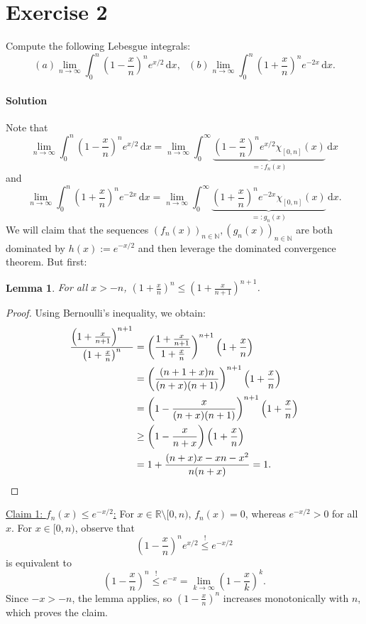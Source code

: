 \documentclass[10pt]{article}\usepackage[]{graphicx}\usepackage[]{color}
\newtheorem*{lemma}{Lemma}
\newcommand{\N}{\mathbb{N}}
\newcommand{\R}{\mathbb{R}}
\newcommand{\df}{\,\textrm{d}}
\begin{document}
\section*{Exercise 2}
Compute the following Lebesgue integrals:
\[
  (a) \lim_{n \to \infty} \int_0^n \left(1 - \frac{x}{n}\right)^n e^{x/2} \df x,~~~
  (b) \lim_{n \to \infty} \int_0^n \left(1 + \frac{x}{n}\right)^n e^{-2x} \df x.
\]

\paragraph{Solution}
Note that 
\[
 \lim_{n \to \infty} \int_0^n \left(1 - \frac{x}{n}\right)^n e^{x/2} \df x = \lim_{n \to \infty} \int_0^{\infty} \underbrace{\left(1 - \frac{x}{n}\right)^n e^{x/2} \chi_{[0, n]}(x)}_{=: f_n(x)} \df x
\]
and
\[
 \lim_{n \to \infty} \int_0^n \left(1 + \frac{x}{n}\right)^n e^{-2x} \df x = \lim_{n \to \infty} \int_0^{\infty} \underbrace{\left(1 + \frac{x}{n}\right)^n e^{-2x} \chi_{[0, n]}(x)}_{=: g_n(x)} \df x.
\]
We will claim that the sequences $(f_n(x))_{n \in \N}, (g_n(x))_{n \in \N}$
are both dominated by $h(x) := e^{-x/2}$ and then leverage the dominated convergence theorem.
But first:

\begin{lemma}
For all $x > - n$, $\left(1 + \frac{x}{n}\right)^n \leq \left(1 + \frac{x}{n+1}\right)^{n+1}$.
\end{lemma}
\begin{proof} Using Bernoulli's inequality, we obtain:
\begin{align*}
  \frac{\left(1 + \frac{x}{n+1}\right)^{n+1}}{\left(1 + \frac{x}{n}\right)^n}
  &= \left(\frac{1 + \frac{x}{n+1}}{1 + \frac{x}{n}}\right)^{n+1}\left(1 + \frac{x}{n}\right) \\
  &= \left(\frac{(n+1+x)n}{(n+x)(n+1)}\right)^{n+1}\left(1 + \frac{x}{n}\right) \\
  &= \left(1 - \frac{x}{(n+x)(n+1)}\right)^{n+1}\left(1 + \frac{x}{n}\right) \\
  &\geq \left(1 - \frac{x}{n+x} \right)\left(1 + \frac{x}{n}\right) \\
  &= 1 + \frac{(n+x)x - xn - x^2}{n(n+x)} = 1.\qedhere
\end{align*}
\end{proof}

\uline{Claim 1: $f_n(x) \leq e^{-x/2}$:}
For $x \in \R \setminus [0,n)$, $f_n(x) = 0$, whereas $e^{-x/2} > 0$ for all $x$.
For $x \in [0,n)$, observe that
\[
 \left(1 - \frac{x}{n}\right)^n e^{x/2} \stackrel{!}{\leq} e^{-x/2}
\]
is equivalent to
\[
  \left(1 - \frac{x}{n}\right)^n \stackrel{!}{\leq} e^{-x} = \lim_{k \to \infty}\left(1 - \frac{x}{k}\right)^k.
\]
Since $-x > -n$, the lemma applies, so $\left(1 - \frac{x}{n}\right)^n$ increases monotonically with $n$, which proves the claim.
\end{document}
